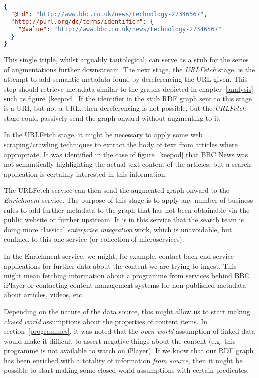 \begin{centering}
\begin{lstlisting}[language=json,label=lst:minimal,caption=Minimal RDF graph in JSON-LD showing only that something exists and a single identifier for it.]
{
  "@id": "http://www.bbc.co.uk/news/technology-27346567",
  "http://purl.org/dc/terms/identifier": {
    "@value": "http://www.bbc.co.uk/news/technology-27346567"
  }
}
\end{lstlisting}
\end{centering}

This single triple, whilst arguably tautological, can serve as a stub
for the series of augmentations further downstream. The next stage,
the \emph{URLFetch} stage, is
the attempt to add semantic metadata found by dereferencing the URL
given. This step should retrieve metadata similar to the graphs depicted
in chapter~\ref{analysis} such as figure~\ref{keepod}. If the identifier
in the stub RDF graph sent to this stage is a URI, but not a URL, then
dereferencing is not possible, but the \emph{URLFetch} stage could
passively send the graph onward without augmenting to it.

In the URLFetch stage, it might be necessary to apply some web scraping/crawling
techniques to extract the body of text from articles where appropriate.
It was identified in the case of figure~\ref{keepod} that BBC News
was not semantically highlighting the actual text content of the articles, but
a search application is certainly interested in this information.

The URLFetch service can then send the augmented graph onward to
the \emph{Enrichment} service. The purpose of this stage is to apply
any number of business rules to add further metadata to the graph
that has not been obtainable via the public website or further upstream. It is
in this service that the search team is doing more classical
\emph{enterprise integration} work, which is unavoidable, but confined
to this one service (or collection of microservices).

In the Enrichment service, we might, for example, contact back-end
service applications for further data about the content we are trying to ingest.
This might mean fetching information about a programme from services
behind BBC iPlayer or contacting content management systems for
non-published metadata about articles, videos, etc.

Depending on the nature of the data source, this might allow us to start
making \emph{closed world} assumptions about the properties of content
items. In section~\ref{programmes}, it was noted that the \emph{open world}
assumption of linked data would make it difficult to assert negative
things about the content (e.g. this programme is not available to
watch on iPlayer). If we know that our RDF graph has been enriched
with a totality of information \emph{from source}, then it might be
possible to start making some closed world assumptions with certain predicates.

